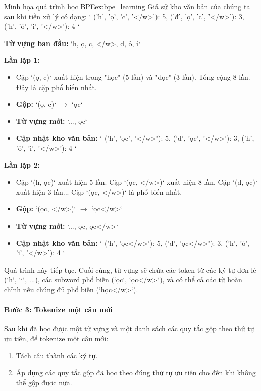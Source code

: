 \begin{example}{Minh họa quá trình học BPE}{ex:bpe_learning}
    Giả sử kho văn bản của chúng ta sau khi tiền xử lý có dạng:
    `{ ('h', 'ọ', 'c', '</w>'): 5, ('đ', 'ọ', 'c', '</w>'): 3, ('h', 'ỏ', 'i', '</w>'): 4 }`

    \textbf{Từ vựng ban đầu:} `{h, ọ, c, </w>, đ, ỏ, i}`
    
    \textbf{Lần lặp 1:}
    \begin{itemize}
        \item Cặp `(ọ, c)` xuất hiện trong "học" (5 lần) và "đọc" (3 lần). Tổng cộng 8 lần. Đây là cặp phổ biến nhất.
        \item \textbf{Gộp:} `(ọ, c)` $\rightarrow$ `ọc`
        \item \textbf{Từ vựng mới:} `{..., ọc}`
        \item \textbf{Cập nhật kho văn bản:} `{ ('h', 'ọc', '</w>'): 5, ('đ', 'ọc', '</w>'): 3, ('h', 'ỏ', 'i', '</w>'): 4 }`
    \end{itemize}

    \textbf{Lần lặp 2:}
    \begin{itemize}
        \item Cặp `(h, ọc)` xuất hiện 5 lần. Cặp `(ọc, </w>)` xuất hiện 8 lần. Cặp `(đ, ọc)` xuất hiện 3 lần... Cặp `(ọc, </w>)` là phổ biến nhất.
        \item \textbf{Gộp:} `(ọc, </w>)` $\rightarrow$ `ọc</w>`
        \item \textbf{Từ vựng mới:} `{..., ọc, ọc</w>}`
        \item \textbf{Cập nhật kho văn bản:} `{ ('h', 'ọc</w>'): 5, ('đ', 'ọc</w>'): 3, ('h', 'ỏ', 'i', '</w>'): 4 }`
    \end{itemize}
    
    Quá trình này tiếp tục. Cuối cùng, từ vựng sẽ chứa các token từ các ký tự đơn lẻ (`h`, `i`, ...), các subword phổ biến (`ọc`, `ọc</w>`), và có thể cả các từ hoàn chỉnh nếu chúng đủ phổ biến (`học</w>`).
\end{example}

\paragraph{Bước 3: Tokenize một câu mới}
Sau khi đã học được một từ vựng và một danh sách các quy tắc gộp theo thứ tự ưu tiên, để tokenize một câu mới:
\begin{enumerate}
    \item Tách câu thành các ký tự.
    \item Áp dụng các quy tắc gộp đã học theo đúng thứ tự ưu tiên cho đến khi không thể gộp được nữa.
\end{enumerate}
